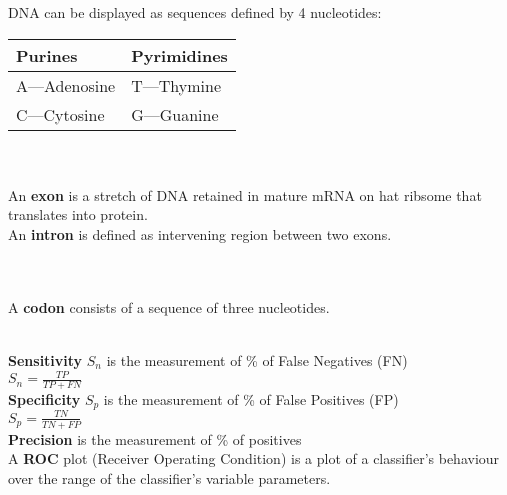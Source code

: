 \documentclass[letterpaper, 10pt]{article}
\begin{document}
DNA can be displayed as sequences defined by 4 nucleotides:\\
\begin{tabular}{|l|l|}
\hline
\textbf{Purines} & \textbf{Pyrimidines}\\
\hline
\color{red}A\color{black}---Adenosine & \color{blue}T\color{black}---Thymine\\
\hline
\color{orange}C\color{black}---Cytosine & \color{purple}G\color{black}---Guanine\\
\hline
\end{tabular}\\\\
An \textbf{exon} is a stretch of DNA retained in mature mRNA on hat ribsome that translates into protein.\\
An \textbf{intron} is defined as intervening region between two exons.\\\\
\\
A \textbf{codon} consists of a sequence of three nucleotides.\\
\\
\textbf{Sensitivity} $S_n$ is the measurement of \% of False Negatives (FN)\\
$S_n=\frac{TP}{TP+FN}$\\
\textbf{Specificity} $S_p$ is the measurement of \% of False Positives (FP)\\
$S_p=\frac{TN}{TN+FP}$\\
\textbf{Precision} is the measurement of \% of positives\\
A \textbf{ROC} plot (Receiver Operating Condition) is a plot of a classifier's behaviour over the range of the classifier's variable parameters.\\\\
\end{document}
